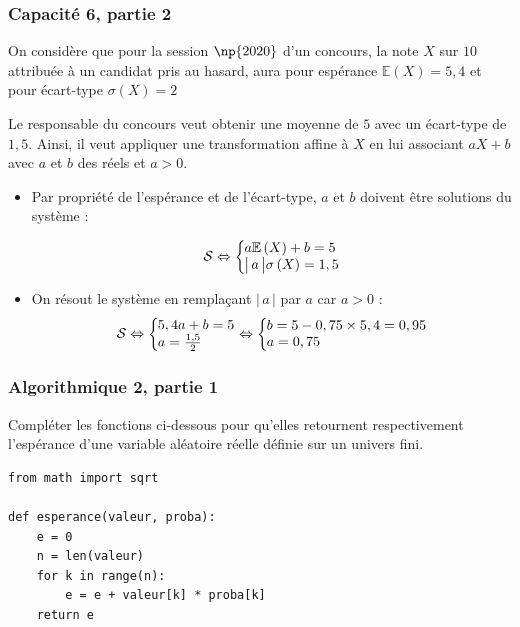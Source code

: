 \documentclass[11pt, hyperref={urlcolor=red,%
            linkcolor=blue, %
            colorlinks=true}]{beamer}
\newcommand{\esperance}[1]{\mathbb{E}\left(#1\right)}
\newcommand{\ecart}[1]{\sigma\left(#1\right)}
\newcommand{\valabs}[1]{\big| \, #1 \, \big|}
\newcommand{\sys}[2]{
\left\lbrace
 \begin{array}{l}
  \negthickspace\negthickspace #1\\
  \negthickspace\negthickspace #2\\
 \end{array}
\right.\negthickspace\negthickspace}
\begin{document}
\begin{frame}

\frametitle{Capacité 6,  partie 2}
On considère que pour la  session $\np{2020}$  d'un concours, la note $X$ sur $10$  attribuée à un candidat pris au hasard, aura pour  espérance  $\esperance{X} = 5,4 $ et pour écart-type $\ecart{X} = 2$ 

Le responsable du concours veut obtenir une moyenne de $5$ avec un écart-type de $1,5$. Ainsi, il veut   appliquer une transformation affine  à $X$ en lui associant $aX+b$ avec $a$ et $b$ des réels et $a>0$.

\begin{itemize}

	\pause \item   Par propriété de l'espérance et de l'écart-type, $a$ et $b$ doivent être solutions du système :
	
$$\mathcal{S} \Leftrightarrow \sys{a\esperance{X}+b=5}{\valabs{a}\ecart{X}=1,5}$$

\pause \item On résout le système en remplaçant $\valabs{a}$ par $a$ car $a>0$ :
$$\mathcal{S} \Leftrightarrow   \sys{5,4a+b=5}{a=\frac{1,5}{2}} \Leftrightarrow \sys{b=5-0,75\times 5,4=0,95}{a=0,75} $$
	
	\end{itemize}
\end{frame}



\begin{frame}[fragile]


\label{algo2}

\frametitle{Algorithmique 2,  partie 1}

Compléter les fonctions ci-dessous pour qu'elles retournent respectivement l'espérance d'une variable aléatoire réelle définie sur un univers fini.

\begin{lstlisting}[style=rond]
from math import sqrt

def esperance(valeur, proba):
    e = 0
    n = len(valeur)
    for k in range(n):
        e = e + valeur[k] * proba[k]
    return e
\end{lstlisting}


\end{frame}
\end{document}
